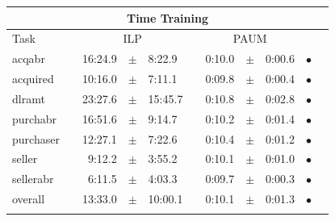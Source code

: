\begin{table}[th!]
\centering 
\begin{tabular}
{lcrclcrcl@{\hspace{0.1cm}}cc}

\multicolumn{11}{c}{Time Training}\\
\hline
Task && \multicolumn{3}{c}{ILP}  && \multicolumn{3}{c}{PAUM} && \\
\hline
            acqabr &&    16:24.9 &  $\pm$  &      8:22.9 & &     0:10.0 &  $\pm$  &      0:00.6 & $\bullet$ \\
          acquired &&    10:16.0 &  $\pm$  &      7:11.1 & &     0:09.8 &  $\pm$  &      0:00.4 & $\bullet$ \\
            dlramt &&    23:27.6 &  $\pm$  &     15:45.7 & &     0:10.8 &  $\pm$  &      0:02.8 & $\bullet$ \\
          purchabr &&    16:51.6 &  $\pm$  &      9:14.7 & &     0:10.2 &  $\pm$  &      0:01.4 & $\bullet$ \\
         purchaser &&    12:27.1 &  $\pm$  &      7:22.6 & &     0:10.4 &  $\pm$  &      0:01.2 & $\bullet$ \\
            seller &&     9:12.2 &  $\pm$  &      3:55.2 & &     0:10.1 &  $\pm$  &      0:01.0 & $\bullet$ \\
         sellerabr &&     6:11.5 &  $\pm$  &      4:03.3 & &     0:09.7 &  $\pm$  &      0:00.3 & $\bullet$ \\
\hline
           overall &&    13:33.0 &  $\pm$  &     10:00.1 & &     0:10.1 &  $\pm$  &      0:01.3 & $\bullet$ \\
\hline
\\


\end{tabular}
\end{table}
